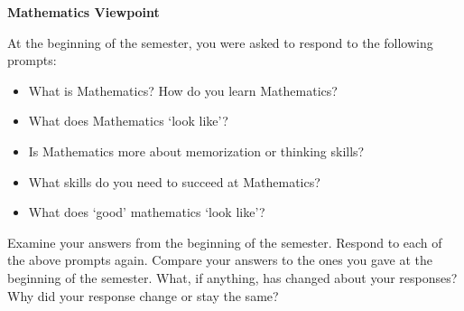 \documentclass[11pt,letterpaper]{article}
\begin{document}

\begin{center} {\Large\bfseries Mathematics Viewpoint} \end{center}

At the beginning of the semester, you were asked to respond to the following prompts:
	\begin{itemize}
	\item What is Mathematics? How do you learn Mathematics?
	\item What does Mathematics `look like'?
	\item Is Mathematics more about memorization or thinking skills?
	\item What skills do you need to succeed at Mathematics?
	\item What does `good' mathematics `look like'?
	\end{itemize}
Examine your answers from the beginning of the semester. Respond to each of the above prompts again. Compare your answers to the ones you gave at the beginning of the semester. What, if anything, has changed about your responses? Why did your response change or stay the same?

\newpage

\phantom{.}
\end{document}
